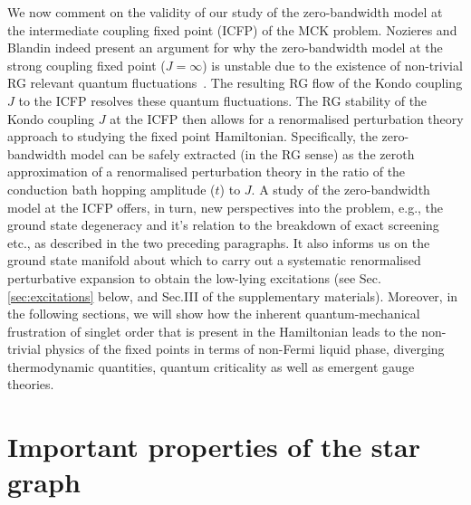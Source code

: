 \documentclass{iopart}
\begin{document}
We now comment on the validity of our study of the zero-bandwidth  model at the intermediate coupling fixed point (ICFP) of the MCK  problem. Nozieres and Blandin indeed present an argument for why the  zero-bandwidth model at the strong coupling fixed point ($J =\infty$)  is unstable due to the existence of non-trivial RG relevant quantum  fluctuations~\cite{Noz_blandin_1980}. The resulting RG flow of the Kondo coupling $J$ to  the ICFP resolves these quantum fluctuations. The RG stability of the  Kondo coupling $J$ at the ICFP then allows for a renormalised perturbation  theory approach to studying the fixed point Hamiltonian. Specifically, the  zero-bandwidth model can be safely extracted (in the RG sense) as the zeroth  approximation of a renormalised perturbation theory in the ratio of  the conduction bath hopping amplitude ($t$) to $J$. A study of the  zero-bandwidth model at the ICFP offers, in turn, new perspectives  into the problem, e.g., the ground state degeneracy and it's relation  to the breakdown of exact screening etc., as described in the two preceding paragraphs. It also informs us on the ground state manifold about which to carry out a systematic renormalised perturbative expansion to obtain the low-lying excitations (see Sec.\ref{sec:excitations} below, and Sec.III of the supplementary materials). Moreover, in the following sections, we will show how the inherent quantum-mechanical frustration of singlet order that is present in the Hamiltonian leads to the non-trivial physics of the fixed points in terms of non-Fermi liquid phase, diverging thermodynamic quantities, quantum criticality as well as emergent gauge theories.
\section{Important properties of the star graph}
\label{sec:props_star}
\end{document}
